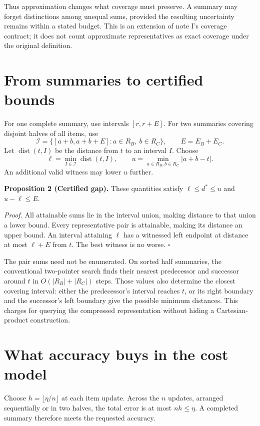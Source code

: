 \documentclass[10pt,english]{article}
\begin{document}
Thus approximation changes what coverage must preserve. A summary may forget distinctions among unequal sums, provided the resulting uncertainty remains within a stated budget. This is an extension of note I's coverage contract; it does not count approximate representatives as exact coverage under the original definition.

\section{From summaries to certified bounds}
For one complete summary, use intervals \([r,r+E]\). For two summaries covering disjoint halves of all items, use
\[
\mathcal I=\{[a+b,a+b+E]:a\in R_B,\ b\in R_C\},
\qquad E=E_B+E_C.
\]
Let \(\operatorname{dist}(t,I)\) be the distance from \(t\) to an interval \(I\). Choose
\[
\ell=\min_{I\in\mathcal I}\operatorname{dist}(t,I),
\qquad u=\min_{a\in R_B,b\in R_C}|a+b-t|.
\]
An additional valid witness may lower \(u\) further.

\begin{tcolorbox}[accentbox]
\textbf{Proposition 2 (Certified gap).} These quantities satisfy \(\ell\le d^*\le u\) and \(u-\ell\le E\).
\end{tcolorbox}
\textit{Proof.} All attainable sums lie in the interval union, making distance to that union a lower bound. Every representative pair is attainable, making its distance an upper bound. An interval attaining \(\ell\) has a witnessed left endpoint at distance at most \(\ell+E\) from \(t\). The best witness is no worse. \hfill\(\square\)

The pair sums need not be enumerated. On sorted half summaries, the conventional two-pointer search finds their nearest predecessor and successor around \(t\) in \(O(|R_B|+|R_C|)\) steps. Those values also determine the closest covering interval: either the predecessor's interval reaches \(t\), or its right boundary and the successor's left boundary give the possible minimum distances. This charges for querying the compressed representation without hiding a Cartesian-product construction.

\section{What accuracy buys in the cost model}
Choose \(h=\lfloor\eta/n\rfloor\) at each item update. Across the \(n\) updates, arranged sequentially or in two halves, the total error is at most \(nh\le\eta\). A completed summary therefore meets the requested accuracy.
\end{document}
